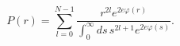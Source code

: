 \begin{equation}
\label{Eq_0502}
P(r) = \sum^{N-1}_{l=0}
  \frac{r^{2l} e^{2e\varphi(r)}}
       {\int^{\infty}_0 ds \, s^{2l+1} e^{2e\varphi(s)}}.
\end{equation}

